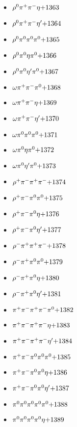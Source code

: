 \begin{multicols}{3}
\begin{itemize}
 \item $ \rho^{0} \pi^{+} \pi^{-} \eta \hfill{+1363}$
 \item $ \rho^{0} \pi^{+} \pi^{-} {\eta^{\prime}} \hfill{+1364}$
 \item $ \rho^{0} \pi^{0} \pi^{0} \pi^{0} \hfill{+1365}$
 \item $ \rho^{0} \pi^{0} \eta \pi^{0} \hfill{+1366}$
 \item $ \rho^{0} \pi^{0} {\eta^{\prime}} \pi^{0} \hfill{+1367}$
 \item $ \omega \pi^{+} \pi^{-} \pi^{0} \hfill{+1368}$
 \item $ \omega \pi^{+} \pi^{-} \eta \hfill{+1369}$
 \item $ \omega \pi^{+} \pi^{-} {\eta^{\prime}} \hfill{+1370}$
 \item $ \omega \pi^{0} \pi^{0} \pi^{0} \hfill{+1371}$
 \item $ \omega \pi^{0} \eta \pi^{0} \hfill{+1372}$
 \item $ \omega \pi^{0} {\eta^{\prime}} \pi^{0} \hfill{+1373}$
 \item $ \rho^{+} \pi^{-} \pi^{+} \pi^{-} \hfill{+1374}$
 \item $ \rho^{+} \pi^{-} \pi^{0} \pi^{0} \hfill{+1375}$
 \item $ \rho^{+} \pi^{-} \pi^{0} \eta \hfill{+1376}$
 \item $ \rho^{+} \pi^{-} \pi^{0} {\eta^{\prime}} \hfill{+1377}$
 \item $ \rho^{-} \pi^{+} \pi^{+} \pi^{-} \hfill{+1378}$
 \item $ \rho^{-} \pi^{+} \pi^{0} \pi^{0} \hfill{+1379}$
 \item $ \rho^{-} \pi^{+} \pi^{0} \eta \hfill{+1380}$
 \item $ \rho^{-} \pi^{+} \pi^{0} {\eta^{\prime}} \hfill{+1381}$
 \item $ \pi^{+} \pi^{-} \pi^{+} \pi^{-} \pi^{0} \hfill{+1382}$
 \item $ \pi^{+} \pi^{-} \pi^{+} \pi^{-} \eta \hfill{+1383}$
 \item $ \pi^{+} \pi^{-} \pi^{+} \pi^{-} {\eta^{\prime}} \hfill{+1384}$
 \item $ \pi^{+} \pi^{-} \pi^{0} \pi^{0} \pi^{0} \hfill{+1385}$
 \item $ \pi^{+} \pi^{-} \pi^{0} \pi^{0} \eta \hfill{+1386}$
 \item $ \pi^{+} \pi^{-} \pi^{0} \pi^{0} {\eta^{\prime}} \hfill{+1387}$
 \item $ \pi^{0} \pi^{0} \pi^{0} \pi^{0} \pi^{0} \hfill{+1388}$
 \item $ \pi^{0} \pi^{0} \pi^{0} \pi^{0} \eta \hfill{+1389}$

\end{itemize}
\end{multicols}
